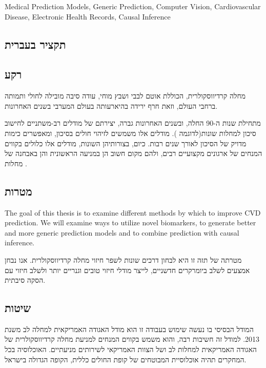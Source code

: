 \documentclass[a4paper,12pt]{article}
\begin{document}
		Medical Prediction Models, Generic Prediction, Computer Vision, Cardiovascular Disease, Electronic Health Records, Causal Inference
	
	\begin{hebrew}	
	\section{\texthebrew{תקציר בעברית}}
	
		\subsection{\texthebrew{רקע}}
		
		מחלה קרדיווסקולרית, הכוללת אוטם לבבי ושבץ מוחי, עודה סיבה מובילה לחולי ותמותה\cite{ODonnell2016} ברחבי העולם, וזאת חרף ירידה בהיארעותה בעולם המערבי בשנים האחרונות\cite{Koton2014,Vangen-Loenne2017}.

				מתחילת שנות ה-90 החלה, ובשנים האחרונות גברה, יצירתם של מודלים רב-משתניים לחישוב סיכון למחלות שונות(לדוגמה \cite{Wilson1998,Conroy2003,DAgostino2008}). מודלים אלו משמשים לזיהוי חולים בסיכון, ומאפשרים כימות מדויק של הסיכון לאורך שנים רבות\cite{Goff2014}. כיום, בצורותיהן השונות, מודלים אלו כלולים בקווים המנחים של ארגונים מקצועיים רבים, ולהם מקום חשוב הן במניעה הראשונית והן באבחנה של מחלות \cite{Graham2007,Goff2014}.
				
		\subsection{\texthebrew{מטרות}}
		
				The goal of this thesis is to examine different methods by which to improve CVD prediction. We will examine ways to utilize novel biomarkers, to generate better and more generic prediction models and to combine prediction with causal inference.
				
				מטרתה של תזה זו היא לבחון דרכים שונות לשפר חיזוי מחלה קרדיווסקולרית. אנו נבחן אמצעים לשלב ביומרקרים חדשניים, לייצר מודלי חיזוי טובים וגנריים יותר ולשלב חיזוי עם הסקה סיבתית.
		
		\subsection{\texthebrew{שיטות}}
		
		המודל הבסיסי בו נעשה שימוש בעבודה זו הוא מודל האגודה האמריקאית למחלה לב משנת 2013\cite{Goff2014}. למודל זה חשיבות רבה, והוא משמש בקווים המנחים למניעת מחלה קרדיווסקולרית של האגודה האמריקאית למחלות לב ושל הצוות האמריקאי לשירותים מניעתיים\cite{Bibbins-Domingo2016}. האוכלוסיה בכל המחקרים תהיה אוכלוסיית המבוטחים של קופת החולים כללית, הקופה הגדולה בישראל.
		

\end{hebrew}
\end{document}
